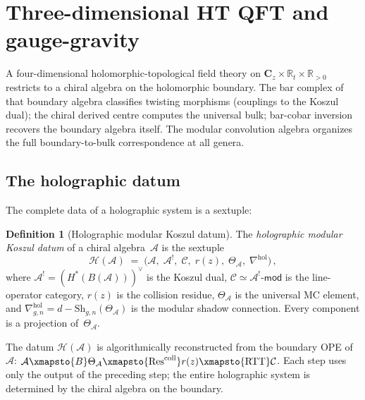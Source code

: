 \documentclass[11pt,reqno]{amsart}
\theoremstyle{definition}
\newtheorem{definition}[theorem]{Definition}
\theoremstyle{remark}
\newcommand{\cA}{\mathcal{A}}
\newcommand{\Res}{\operatorname{Res}}
\renewcommand{\Bbbk}{\mathbf{C}}
\numberwithin{equation}{section}
\begin{document}
\section{Three-dimensional HT QFT and gauge-gravity}
\label{sec:ht-qft}

A four-dimensional holomorphic-topological field theory on
$\Bbbk_z \times \mathbb{R}_t \times \mathbb{R}_{>0}$
restricts to a chiral algebra on the holomorphic boundary.
The bar complex of that boundary algebra classifies
twisting morphisms (couplings to the Koszul dual); the
chiral derived centre computes the universal bulk; bar-cobar
inversion recovers the boundary algebra itself. The modular
convolution algebra organizes the full boundary-to-bulk
correspondence at all genera.

\subsection{The holographic datum}
\label{ssec:holographic-datum}

The complete data of a holographic system is a sextuple:

\begin{definition}[Holographic modular Koszul datum]
\label{def:holographic}
The \emph{holographic modular Koszul datum} of a chiral
algebra~$\cA$ is the sextuple
\begin{equation}\label{eq:holographic-datum}
\mathcal{H}(\cA)
\;=\;
\bigl(\cA,\;
\cA^!,\;
\mathcal{C},\;
r(z),\;
\Theta_\cA,\;
\nabla^{\mathrm{hol}}\bigr)\,,
\end{equation}
where $\cA^! = (H^*(B(\cA)))^\vee$ is the Koszul dual,
$\mathcal{C} \simeq \cA^!\text{-}\mathsf{mod}$ is the
line-operator category, $r(z)$ is the collision residue,
$\Theta_\cA$ is the universal MC element, and
$\nabla^{\mathrm{hol}}_{g,n} = d -
\mathrm{Sh}_{g,n}(\Theta_\cA)$ is the modular shadow
connection. Every component is a projection
of~$\Theta_\cA$.
\end{definition}

The datum $\mathcal{H}(\cA)$ is algorithmically
reconstructed from the boundary OPE of~$\cA$:
$\cA \xmapsto{B} \Theta_\cA \xmapsto{\Res^{\mathrm{coll}}}
r(z) \xmapsto{\mathrm{RTT}} \mathcal{C}$. Each step uses
only the output of the preceding step; the entire holographic
system is determined by the chiral algebra on the boundary.
\end{document}
